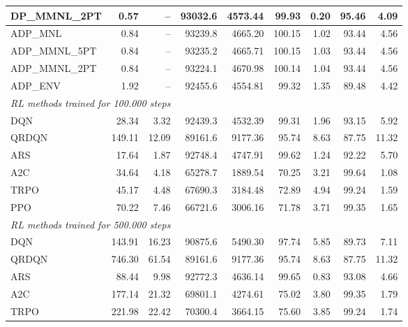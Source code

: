 \begin{samepage}
\begin{center}
\begin{tabular}{l|rr|rr|rr|rr}
    DP\_MMNL\_2PT &     0.57 &    -- &    93032.6 &    4573.44 &   99.93 &    0.20 &   95.46 &    4.09 \\
    \midrule
    ADP\_MNL     &     0.84 &    -- &    93239.8 &    4665.20 &  100.15 &    1.02 &   93.44 &    4.56 \\
    ADP\_MMNL\_5PT &     0.84 &    -- &    93235.2 &    4665.71 &  100.15 &    1.03 &   93.44 &    4.56 \\
    ADP\_MMNL\_2PT &     0.84 &    -- &    93224.1 &    4670.98 &  100.14 &    1.04 &   93.44 &    4.56 \\
    ADP\_ENV     &     1.92 &    -- &    92455.6 &    4554.81 &   99.32 &    1.35 &   89.48 &    4.42 \\
    \midrule
    \multicolumn{9}{l}{\textit{RL methods trained for 100.000 steps}} \\
    \midrule
    DQN          &    28.34 &     3.32 &    92439.3 &    4532.39 &   99.31 &    1.96 &   93.15 &    5.92 \\
    QRDQN        &   149.11 &    12.09 &    89161.6 &    9177.36 &   95.74 &    8.63 &   87.75 &   11.32 \\
    ARS          &    17.64 &     1.87 &    92748.4 &    4747.91 &   99.62 &    1.24 &   92.22 &    5.70 \\
    A2C          &    34.64 &     4.18 &    65278.7 &    1889.54 &   70.25 &    3.21 &   99.64 &    1.08 \\
    TRPO         &    45.17 &     4.48 &    67690.3 &    3184.48 &   72.89 &    4.94 &   99.24 &    1.59 \\
    PPO          &    70.22 &     7.46 &    66721.6 &    3006.16 &   71.78 &    3.71 &   99.35 &    1.65 \\
    \midrule
    \multicolumn{9}{l}{\textit{RL methods trained for 500.000 steps}} \\
    \midrule
    DQN          &   143.91 &    16.23 &    90875.6 &    5490.30 &   97.74 &    5.85 &   89.73 &    7.11 \\
    QRDQN        &   746.30 &    61.54 &    89161.6 &    9177.36 &   95.74 &    8.63 &   87.75 &   11.32 \\
    ARS          &    88.44 &     9.98 &    92772.3 &    4636.14 &   99.65 &    0.83 &   93.08 &    4.66 \\
    A2C          &   177.14 &    21.32 &    69801.1 &    4274.61 &   75.02 &    3.80 &   99.35 &    1.79 \\
    TRPO         &   221.98 &    22.42 &    70300.4 &    3664.15 &   75.60 &    3.85 &   99.24 &    1.74 \\

\end{tabular}
\end{center}
\end{samepage}
